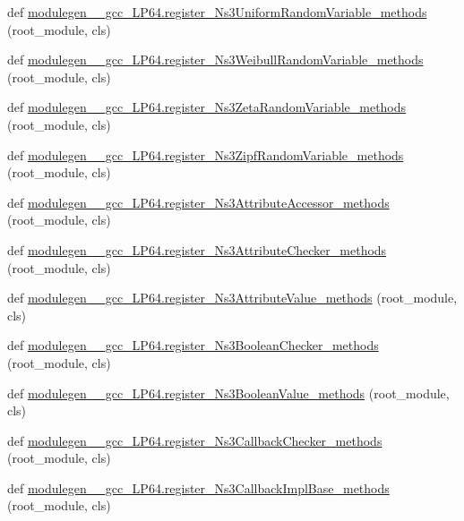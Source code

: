 \begin{DoxyCompactItemize}
def \hyperlink{namespacemodulegen____gcc__LP64_a4aa9337458c6bfbb16285c72600d2605}{modulegen\+\_\+\+\_\+gcc\+\_\+\+L\+P64.\+register\+\_\+\+Ns3\+Uniform\+Random\+Variable\+\_\+methods} (root\+\_\+module, cls)
\item 
def \hyperlink{namespacemodulegen____gcc__LP64_a77ea65e0aa1398f09b27adc28eec22cd}{modulegen\+\_\+\+\_\+gcc\+\_\+\+L\+P64.\+register\+\_\+\+Ns3\+Weibull\+Random\+Variable\+\_\+methods} (root\+\_\+module, cls)
\item 
def \hyperlink{namespacemodulegen____gcc__LP64_a0627de79307ebfed0def7640ef614931}{modulegen\+\_\+\+\_\+gcc\+\_\+\+L\+P64.\+register\+\_\+\+Ns3\+Zeta\+Random\+Variable\+\_\+methods} (root\+\_\+module, cls)
\item 
def \hyperlink{namespacemodulegen____gcc__LP64_ac906c1eb78170163bc3e2e3e65f8e43d}{modulegen\+\_\+\+\_\+gcc\+\_\+\+L\+P64.\+register\+\_\+\+Ns3\+Zipf\+Random\+Variable\+\_\+methods} (root\+\_\+module, cls)
\item 
def \hyperlink{namespacemodulegen____gcc__LP64_a88b38d1f62a9078cdbfc0f0d77a01866}{modulegen\+\_\+\+\_\+gcc\+\_\+\+L\+P64.\+register\+\_\+\+Ns3\+Attribute\+Accessor\+\_\+methods} (root\+\_\+module, cls)
\item 
def \hyperlink{namespacemodulegen____gcc__LP64_a7a7d7cb7b6a065a93209b09c08d1c096}{modulegen\+\_\+\+\_\+gcc\+\_\+\+L\+P64.\+register\+\_\+\+Ns3\+Attribute\+Checker\+\_\+methods} (root\+\_\+module, cls)
\item 
def \hyperlink{namespacemodulegen____gcc__LP64_a91d88e3bac410892f68a8f1bfd117d79}{modulegen\+\_\+\+\_\+gcc\+\_\+\+L\+P64.\+register\+\_\+\+Ns3\+Attribute\+Value\+\_\+methods} (root\+\_\+module, cls)
\item 
def \hyperlink{namespacemodulegen____gcc__LP64_aae51853cedcef201fde08823f24cde8f}{modulegen\+\_\+\+\_\+gcc\+\_\+\+L\+P64.\+register\+\_\+\+Ns3\+Boolean\+Checker\+\_\+methods} (root\+\_\+module, cls)
\item 
def \hyperlink{namespacemodulegen____gcc__LP64_a385ab77a8209f9393063c2711e2943eb}{modulegen\+\_\+\+\_\+gcc\+\_\+\+L\+P64.\+register\+\_\+\+Ns3\+Boolean\+Value\+\_\+methods} (root\+\_\+module, cls)
\item 
def \hyperlink{namespacemodulegen____gcc__LP64_a1ef896a5bde844de40d219e98ceb0cee}{modulegen\+\_\+\+\_\+gcc\+\_\+\+L\+P64.\+register\+\_\+\+Ns3\+Callback\+Checker\+\_\+methods} (root\+\_\+module, cls)
\item 
def \hyperlink{namespacemodulegen____gcc__LP64_a27471f48136ec47282f70d414c0f7b6a}{modulegen\+\_\+\+\_\+gcc\+\_\+\+L\+P64.\+register\+\_\+\+Ns3\+Callback\+Impl\+Base\+\_\+methods} (root\+\_\+module, cls)

\end{DoxyCompactItemize}
